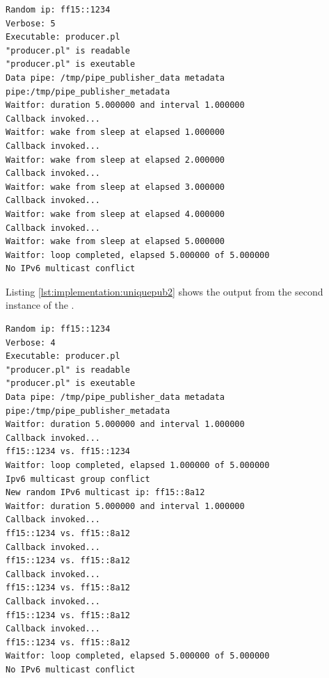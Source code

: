 \begin{lstlisting}
Random ip: ff15::1234
Verbose: 5
Executable: producer.pl
"producer.pl" is readable
"producer.pl" is exeutable
Data pipe: /tmp/pipe_publisher_data metadata pipe:/tmp/pipe_publisher_metadata
Waitfor: duration 5.000000 and interval 1.000000
Callback invoked...
Waitfor: wake from sleep at elapsed 1.000000
Callback invoked...
Waitfor: wake from sleep at elapsed 2.000000
Callback invoked...
Waitfor: wake from sleep at elapsed 3.000000
Callback invoked...
Waitfor: wake from sleep at elapsed 4.000000
Callback invoked...
Waitfor: wake from sleep at elapsed 5.000000
Waitfor: loop completed, elapsed 5.000000 of 5.000000
No IPv6 multicast conflict
\end{lstlisting} \label{lst:implementation:uniquepub1}

Listing \ref{lst:implementation:uniquepub2} shows the output from the second instance of the .

\begin{lstlisting}
Random ip: ff15::1234
Verbose: 4
Executable: producer.pl
"producer.pl" is readable
"producer.pl" is exeutable
Data pipe: /tmp/pipe_publisher_data metadata pipe:/tmp/pipe_publisher_metadata
Waitfor: duration 5.000000 and interval 1.000000
Callback invoked...
ff15::1234 vs. ff15::1234
Waitfor: loop completed, elapsed 1.000000 of 5.000000
Ipv6 multicast group conflict
New random IPv6 multicast ip: ff15::8a12
Waitfor: duration 5.000000 and interval 1.000000
Callback invoked...
ff15::1234 vs. ff15::8a12
Callback invoked...
ff15::1234 vs. ff15::8a12
Callback invoked...
ff15::1234 vs. ff15::8a12
Callback invoked...
ff15::1234 vs. ff15::8a12
Callback invoked...
ff15::1234 vs. ff15::8a12
Waitfor: loop completed, elapsed 5.000000 of 5.000000
No IPv6 multicast conflict
\end{lstlisting}\label{lst:implementation:uniquepub2}




